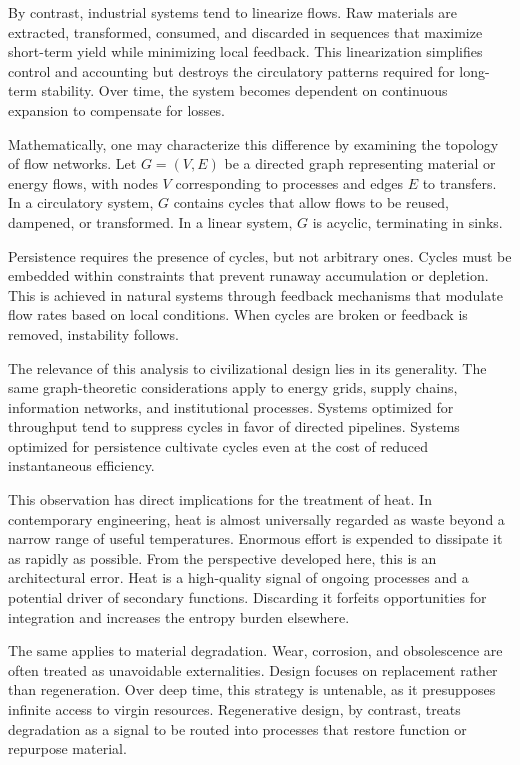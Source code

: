 \documentclass[12pt,oneside]{book}
\begin{document}
By contrast, industrial systems tend to linearize flows. Raw materials are extracted, transformed, consumed, and discarded in sequences that maximize short-term yield while minimizing local feedback. This linearization simplifies control and accounting but destroys the circulatory patterns required for long-term stability. Over time, the system becomes dependent on continuous expansion to compensate for losses.

Mathematically, one may characterize this difference by examining the topology of flow networks. Let \(G = (V,E)\) be a directed graph representing material or energy flows, with nodes \(V\) corresponding to processes and edges \(E\) to transfers. In a circulatory system, \(G\) contains cycles that allow flows to be reused, dampened, or transformed. In a linear system, \(G\) is acyclic, terminating in sinks.

Persistence requires the presence of cycles, but not arbitrary ones. Cycles must be embedded within constraints that prevent runaway accumulation or depletion. This is achieved in natural systems through feedback mechanisms that modulate flow rates based on local conditions. When cycles are broken or feedback is removed, instability follows.

The relevance of this analysis to civilizational design lies in its generality. The same graph-theoretic considerations apply to energy grids, supply chains, information networks, and institutional processes. Systems optimized for throughput tend to suppress cycles in favor of directed pipelines. Systems optimized for persistence cultivate cycles even at the cost of reduced instantaneous efficiency.

This observation has direct implications for the treatment of heat. In contemporary engineering, heat is almost universally regarded as waste beyond a narrow range of useful temperatures. Enormous effort is expended to dissipate it as rapidly as possible. From the perspective developed here, this is an architectural error. Heat is a high-quality signal of ongoing processes and a potential driver of secondary functions. Discarding it forfeits opportunities for integration and increases the entropy burden elsewhere.

The same applies to material degradation. Wear, corrosion, and obsolescence are often treated as unavoidable externalities. Design focuses on replacement rather than regeneration. Over deep time, this strategy is untenable, as it presupposes infinite access to virgin resources. Regenerative design, by contrast, treats degradation as a signal to be routed into processes that restore function or repurpose material.
\end{document}
